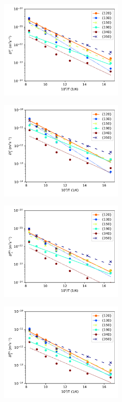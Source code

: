 \documentclass{elsarticle}
\begin{document}
\begin{figure}[!ht]
\centering
\begin{subfigure}{0.45\textwidth}
	\centering
	\caption{}
	\includegraphics[height=5cm]{u10mo_U_Dx.pdf}
\end{subfigure}
\begin{subfigure}{0.45\textwidth}
	\centering
	\caption{}
	\includegraphics[height=5cm]{u10mo_U_Dz.pdf}
\end{subfigure}
\begin{subfigure}{0.45\textwidth}
	\centering
	\caption{}
	\includegraphics[height=5cm]{u10mo_Mo_Dx.pdf}
\end{subfigure}
\begin{subfigure}{0.45\textwidth}
	\centering
	\caption{}
	\includegraphics[height=5cm]{u10mo_Mo_Dz.pdf}

\end{subfigure}
\end{figure}
\end{document}
